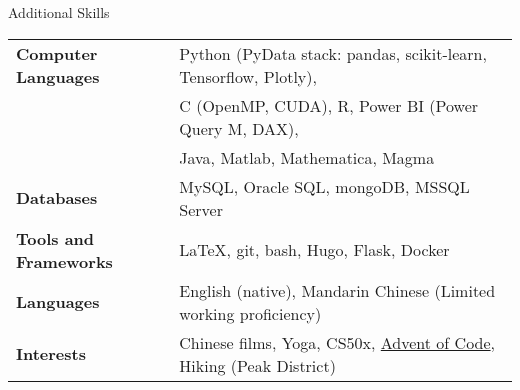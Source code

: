 \documentclass{resume} %
\begin{document}
\begin{rSection}{Additional Skills}
	
	\begin{tabular}{ @{} >{\bfseries}l @{\hspace{6ex}} l }
		Computer Languages & Python (PyData stack: pandas, scikit-learn, Tensorflow, Plotly), \\
		& C (OpenMP, CUDA), R, Power BI (Power Query M, DAX), \\
		& Java, Matlab, Mathematica, Magma \\
		Databases & MySQL, Oracle SQL, mongoDB, MSSQL Server \\
		Tools and Frameworks & LaTeX, git, bash, Hugo, Flask, Docker \\
		Languages & English (native), Mandarin Chinese (Limited working proficiency) \smallskip \\
		Interests & Chinese films, Yoga, CS50x,  \href{https://github.com/edwardmpearce/adventofcode}{Advent of Code}, Hiking (Peak District)
	\end{tabular}
	
\end{rSection}





\end{document}
